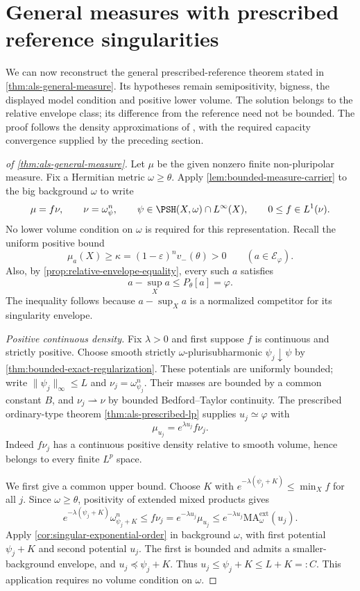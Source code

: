\section{General measures with prescribed reference singularities}
\label{sec:general-measure-relative}

We can now reconstruct the general prescribed-reference theorem stated in \cref{thm:als-general-measure}. Its hypotheses remain semipositivity, bigness, the displayed model condition and positive lower volume. The solution belongs to the relative envelope class; its difference from the reference need not be bounded. The proof follows the density approximations of \cite[Theorem 5.8 and Corollary 5.9]{ALS26}, with the required capacity convergence supplied by the preceding section.

\begin{proof}[of \cref{thm:als-general-measure}]
Let $\mu$ be the given nonzero finite non-pluripolar measure. Fix a Hermitian metric $\omega\geq\theta$. Apply \cref{lem:bounded-measure-carrier} to the big background $\omega$ to write
\[
 \mu=f\nu,\qquad \nu=\omega_\psi^n,\qquad
 \psi\in\PSH(X,\omega)\cap L^\infty(X),\qquad
 0\leq f\in L^1(\nu).
\]
No lower volume condition on $\omega$ is required for this representation. Recall the uniform positive bound
\[
 \mu_a(X)\geq\kappa=(1-\varepsilon)^n v_-(\theta)>0
 \qquad(a\in\mathcal E_\varphi).
\]
Also, by \cref{prop:relative-envelope-equality}, every such $a$ satisfies
\begin{equation}\label{eq:relative-normalized-model-bound}
 a-\sup_Xa\leq P_\theta[a]=\varphi.
\end{equation}
The inequality follows because $a-\sup_Xa$ is a normalized competitor for its singularity envelope.

\emph{Positive continuous density.} Fix $\lambda>0$ and first suppose $f$ is continuous and strictly positive. Choose smooth strictly $\omega$-plurisubharmonic $\psi_j\downarrow\psi$ by \cref{thm:bounded-exact-regularization}. These potentials are uniformly bounded; write $\|\psi_j\|_\infty\leq L$ and $\nu_j=\omega_{\psi_j}^n$. Their masses are bounded by a common constant $B$, and $\nu_j\rightharpoonup\nu$ by bounded Bedford--Taylor continuity. The prescribed ordinary-type theorem \cref{thm:als-prescribed-lp} supplies $u_j\simeq\varphi$ with
\[
 \mu_{u_j}=e^{\lambda u_j}f\nu_j.
\]
Indeed $f\nu_j$ has a continuous positive density relative to smooth volume, hence belongs to every finite $L^p$ space.

We first give a common upper bound. Choose $K$ with
$e^{-\lambda(\psi_j+K)}\leq\min_Xf$ for all $j$. Since $\omega\geq\theta$, positivity of extended mixed products gives
\[
 e^{-\lambda(\psi_j+K)}\omega_{\psi_j+K}^n
 \leq f\nu_j
 =e^{-\lambda u_j}\mu_{u_j}
 \leq e^{-\lambda u_j}\mathrm{MA}^{\mathrm{ext}}_\omega(u_j).
\]
Apply \cref{cor:singular-exponential-order} in background $\omega$, with first potential $\psi_j+K$ and second potential $u_j$. The first is bounded and admits a smaller-background envelope, and $u_j\preceq\psi_j+K$. Thus $u_j\leq\psi_j+K\leq L+K=:C$. This application requires no volume condition on $\omega$.


\end{proof}
